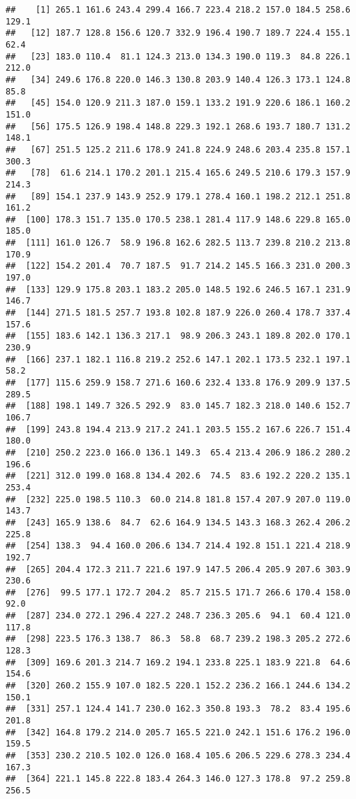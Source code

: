 \documentclass[]{article}
\begin{document}
\begin{verbatim}
##    [1] 265.1 161.6 243.4 299.4 166.7 223.4 218.2 157.0 184.5 258.6 129.1
##   [12] 187.7 128.8 156.6 120.7 332.9 196.4 190.7 189.7 224.4 155.1  62.4
##   [23] 183.0 110.4  81.1 124.3 213.0 134.3 190.0 119.3  84.8 226.1 212.0
##   [34] 249.6 176.8 220.0 146.3 130.8 203.9 140.4 126.3 173.1 124.8  85.8
##   [45] 154.0 120.9 211.3 187.0 159.1 133.2 191.9 220.6 186.1 160.2 151.0
##   [56] 175.5 126.9 198.4 148.8 229.3 192.1 268.6 193.7 180.7 131.2 148.1
##   [67] 251.5 125.2 211.6 178.9 241.8 224.9 248.6 203.4 235.8 157.1 300.3
##   [78]  61.6 214.1 170.2 201.1 215.4 165.6 249.5 210.6 179.3 157.9 214.3
##   [89] 154.1 237.9 143.9 252.9 179.1 278.4 160.1 198.2 212.1 251.8 161.2
##  [100] 178.3 151.7 135.0 170.5 238.1 281.4 117.9 148.6 229.8 165.0 185.0
##  [111] 161.0 126.7  58.9 196.8 162.6 282.5 113.7 239.8 210.2 213.8 170.9
##  [122] 154.2 201.4  70.7 187.5  91.7 214.2 145.5 166.3 231.0 200.3 197.0
##  [133] 129.9 175.8 203.1 183.2 205.0 148.5 192.6 246.5 167.1 231.9 146.7
##  [144] 271.5 181.5 257.7 193.8 102.8 187.9 226.0 260.4 178.7 337.4 157.6
##  [155] 183.6 142.1 136.3 217.1  98.9 206.3 243.1 189.8 202.0 170.1 230.9
##  [166] 237.1 182.1 116.8 219.2 252.6 147.1 202.1 173.5 232.1 197.1  58.2
##  [177] 115.6 259.9 158.7 271.6 160.6 232.4 133.8 176.9 209.9 137.5 289.5
##  [188] 198.1 149.7 326.5 292.9  83.0 145.7 182.3 218.0 140.6 152.7 106.7
##  [199] 243.8 194.4 213.9 217.2 241.1 203.5 155.2 167.6 226.7 151.4 180.0
##  [210] 250.2 223.0 166.0 136.1 149.3  65.4 213.4 206.9 186.2 280.2 196.6
##  [221] 312.0 199.0 168.8 134.4 202.6  74.5  83.6 192.2 220.2 135.1 253.4
##  [232] 225.0 198.5 110.3  60.0 214.8 181.8 157.4 207.9 207.0 119.0 143.7
##  [243] 165.9 138.6  84.7  62.6 164.9 134.5 143.3 168.3 262.4 206.2 225.8
##  [254] 138.3  94.4 160.0 206.6 134.7 214.4 192.8 151.1 221.4 218.9 192.7
##  [265] 204.4 172.3 211.7 221.6 197.9 147.5 206.4 205.9 207.6 303.9 230.6
##  [276]  99.5 177.1 172.7 204.2  85.7 215.5 171.7 266.6 170.4 158.0  92.0
##  [287] 234.0 272.1 296.4 227.2 248.7 236.3 205.6  94.1  60.4 121.0 117.8
##  [298] 223.5 176.3 138.7  86.3  58.8  68.7 239.2 198.3 205.2 272.6 128.3
##  [309] 169.6 201.3 214.7 169.2 194.1 233.8 225.1 183.9 221.8  64.6 154.6
##  [320] 260.2 155.9 107.0 182.5 220.1 152.2 236.2 166.1 244.6 134.2 150.1
##  [331] 257.1 124.4 141.7 230.0 162.3 350.8 193.3  78.2  83.4 195.6 201.8
##  [342] 164.8 179.2 214.0 205.7 165.5 221.0 242.1 151.6 176.2 196.0 159.5
##  [353] 230.2 210.5 102.0 126.0 168.4 105.6 206.5 229.6 278.3 234.4 167.3
##  [364] 221.1 145.8 222.8 183.4 264.3 146.0 127.3 178.8  97.2 259.8 256.5

\end{verbatim}
\end{document}
